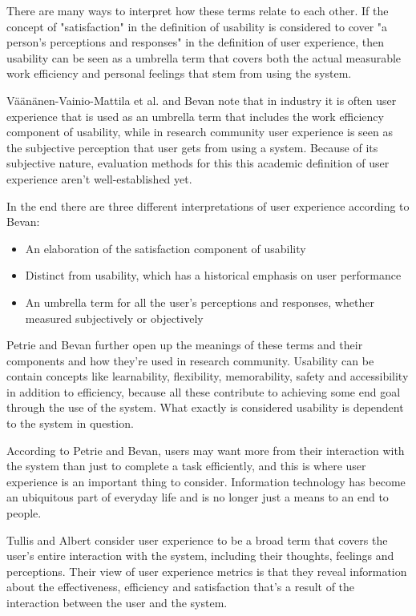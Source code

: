 There are many ways to interpret how these terms relate to each other. If the concept of "satisfaction" in the definition of usability is considered to cover "a person's perceptions and responses" in the definition of user experience, then usability can be seen as a umbrella term that covers both the actual measurable work efficiency and personal feelings that stem from using the system.

Väänänen-Vainio-Mattila et al. and Bevan note that in industry it is often user experience that is used as an umbrella term that includes the work efficiency component of usability, while in research community user experience is seen as the subjective perception that user gets from using a system. Because of its subjective nature, evaluation methods for this this academic definition of user experience aren't well-established yet. \cite{bevan2009difference, vaananen2008towards}

In the end there are three different interpretations of user experience according to Bevan: \begin{itemize}
\item An  elaboration  of  the  satisfaction  component  of usability
\item Distinct  from  usability,  which  has  a  historical emphasis on user performance
\item An  umbrella  term  for  all  the  user’s  perceptions  and responses,  whether  measured  subjectively  or objectively
\end{itemize}
\cite{bevan2009difference}

Petrie and Bevan further open up the meanings of these terms and their components and how they're used in research community. Usability can be contain concepts like learnability, flexibility, memorability, safety and accessibility in addition to efficiency, because all these contribute to achieving some end goal through the use of the system. What exactly is considered usability is dependent to the system in question. 

According to Petrie and Bevan, users may want more from their interaction with the system than just to complete a task efficiently, and this is where user experience is an important thing to consider. Information technology has become an ubiquitous part of everyday life and is no longer just a means to an end to people.
\cite{bevanevaluation}

\cite{bevan2009difference, bevaniso, bevanevaluation, bevanstandard}

Tullis and Albert consider user experience to be a broad term that covers the user's entire interaction with the system, including their thoughts, feelings and perceptions. Their view of user experience metrics is that they reveal information about the effectiveness, efficiency and satisfaction that's a result of the interaction between the user and the system. \cite{albert2013measuring}

